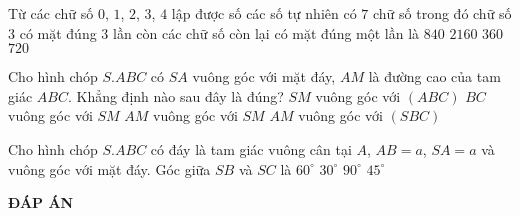 \begin{ex}%
Từ các chữ số $0$, $1$, $2$, $3$, $4$ lập được số các số tự nhiên có $7$ chữ số trong đó chữ số $3$ có mặt đúng $3$ lần còn các chữ số còn lại có mặt đúng một lần là
\choice
{$840$}
{$2160$}
{$360$}
{\True $720$}
\end{ex}

\begin{ex}%
Cho hình chóp $S.ABC$ có $SA$ vuông góc với mặt đáy, $AM$ là đường cao của tam giác $ABC$. Khẳng định nào sau đây là đúng?
\choice
{$SM$ vuông góc với $(ABC)$}
{\True $BC$ vuông góc với $SM$}
{$AM$ vuông góc với $SM$}
{$AM$ vuông góc với $(SBC)$}
\end{ex}

\begin{ex}%
Cho hình chóp $S.ABC$  có đáy là tam giác vuông cân tại $A$, $AB=a$, $SA=a$ và vuông góc với mặt đáy. Góc giữa $SB$ và $SC$ là
\choice
{\True $60^\circ$}
{$30^\circ$}
{$90^\circ$}
{$45^\circ$}
\end{ex}

\newpage
\begin{center}
	\textbf{ĐÁP ÁN}
\end{center}
\begin{multicols}{10}
	 
\end{multicols}

